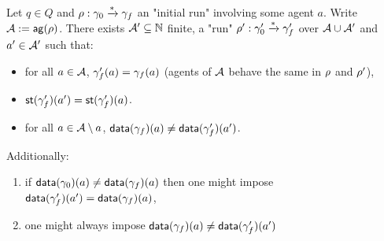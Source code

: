 \begin{lemma}[Copycat]\label{lem:copycat}
Let $q \in Q$ and  $\rho : \gamma_0 \xrightarrow{*} \gamma_f$ an "initial run"  involving some agent $a$. Write $\mathcal{A} := \mathsf{ag}(\rho)$. There exists $\mathcal{A}' \subseteq \mathbb{N}$ finite, a "run" $\rho': \gamma_0' \xrightarrow{*} \gamma_f'$ over $\mathcal{A} \cup \mathcal{A}'$ and $a' \in \mathcal{A}'$ such that:
\begin{itemize}
\item for all $a \in \mathcal{A}$, $\gamma_f'(a) = \gamma_f(a)$ (agents of $\mathcal{A}$ behave the same in $\rho$ and $\rho'$),
\item $\mathsf{st}(\gamma_f')(a') = \mathsf{st}(\gamma_f')(a)$.
\item for all $a \in \mathcal{A} \setminus a$, $\mathsf{data}(\gamma_f)(a) \ne \mathsf{data}(\gamma_f')(a')$.
\end{itemize}
Additionally:
\begin{enumerate}
\item if $\mathsf{data}(\gamma_0)(a) \ne \mathsf{data}(\gamma_f)(a)$ then one might impose $\mathsf{data}(\gamma_f')(a') = \mathsf{data}(\gamma_f)(a)$,
\item one might always impose $\mathsf{data}(\gamma_f)(a) \ne \mathsf{data}(\gamma_f')(a')$
\end{enumerate}
		
	
	
	
\end{lemma}


